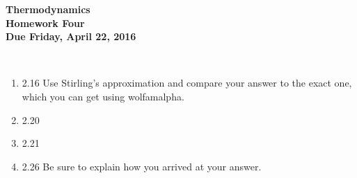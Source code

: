 \documentclass[12pt]{article}
\begin{document}
\pagestyle{empty}
 
\begin{center}
{\large {\bf Thermodynamics}}\\
\medskip
{\large {\bf Homework Four}}\\
\medskip
{ {\bf Due Friday, April 22, 2016}}\\
\end{center}

\hspace{2mm}\\
\noindent 

\begin{enumerate}
\setlength{\itemsep}{1mm}
  \item 2.16 Use Stirling's approximation and compare your answer to
    the exact one, which you can get using wolfamalpha.
  \item 2.20
  \item 2.21
  \item 2.26 Be sure to explain how you arrived at your answer.
\end{enumerate}
\end{document}
